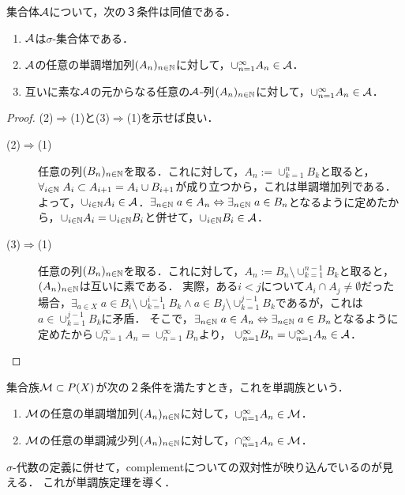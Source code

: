 \documentclass[uplatex, dvipdfmx]{jsreport}
\begin{document}
\begin{theorem}\label{thm-characterization-of-sigma-additivity}
    集合体$\mathcal{A}$について，次の３条件は同値である．
    \begin{enumerate}
        \item $\mathcal{A}$は$\sigma$-集合体である．
        \item $\mathcal{A}$の任意の単調増加列$(A_n)_{n\in\mathbb{N}}$に対して，$\cup_{n=1}^\infty A_n\in\mathcal{A}$．
        \item 互いに素な$\mathcal{A}$の元からなる任意の$\mathcal{A}$-列$(A_n)_{n\in\mathbb{N}}$に対して，$\cup^\infty_{n=1}A_n\in\mathcal{A}$．
    \end{enumerate}
\end{theorem}
\begin{proof}
    (2)$\Rightarrow$(1)と(3)$\Rightarrow$(1)を示せば良い．
    \begin{description}
        \item[(2)$\Rightarrow$(1)] 
        任意の列$(B_n)_{n\in\mathbb{N}}$を取る．これに対して，$A_n:=\cup_{k=1}^nB_k$と取ると，$\forall_{i\in\mathbb{N}}\;A_i\subset A_{i+1}=A_i\cup B_{i+1}$が成り立つから，これは単調増加列である．
        よって，$\cup_{i\in\mathbb{N}}A_i\in\mathcal{A}$．$\exists_{n\in\mathbb{N}}\;a\in A_n\Leftrightarrow\exists_{n\in\mathbb{N}}\;a\in B_n$となるように定めたから，$\cup_{i\in\mathbb{N}}A_i=\cup_{i\in\mathbb{N}}B_i$と併せて，$\cup_{i\in\mathbb{N}}B_i\in\mathcal{A}$．
        \item[(3)$\Rightarrow$(1)]
        任意の列$(B_n)_{n\in\mathbb{N}}$を取る．これに対して，$A_n:=B_n\setminus\cup_{k=1}^{n-1}B_k$と取ると，$(A_n)_{n\in\mathbb{N}}$は互いに素である．
        実際，ある$i<j$について$A_i\cap A_j\ne\emptyset$だった場合，$\exists_{a\in X}\;a\in B_i\setminus\cup_{k=1}^{i-1}B_k\land a\in B_j\setminus\cup^{j-1}_{k=1}B_k$であるが，これは$a\in\cup^{j-1}_{k=1}B_k$に矛盾．
        そこで，$\exists_{n\in\mathbb{N}}\;a\in A_n\Leftrightarrow\exists_{n\in\mathbb{N}}\;a\in B_n$となるように定めたから$\cup^\infty_{n=1}A_n=\cup^\infty_{n=1}B_n$より，
        $\cup_{n=1}^\infty B_n=\cup_{n=1}^\infty A_n\in\mathcal{A}$．
    \end{description}
\end{proof}

\begin{definition}
    集合族$\mathcal{M}\subset P(X)$が次の２条件を満たすとき，これを単調族という．
    \begin{enumerate}
        \item $\mathcal{M}$の任意の単調増加列$(A_n)_{n\in\mathbb{N}}$に対して，$\cup^\infty_{n=1}A_n\in\mathcal{M}$．
        \item $\mathcal{M}$の任意の単調減少列$(A_n)_{n\in\mathbb{N}}$に対して，$\cap^\infty_{n=1}A_n\in\mathcal{M}$．
    \end{enumerate}
\end{definition}
\begin{remarks}
    $\sigma$-代数の定義に併せて，complementについての双対性が映り込んでいるのが見える．
    これが単調族定理を導く．
\end{remarks}
\end{document}

